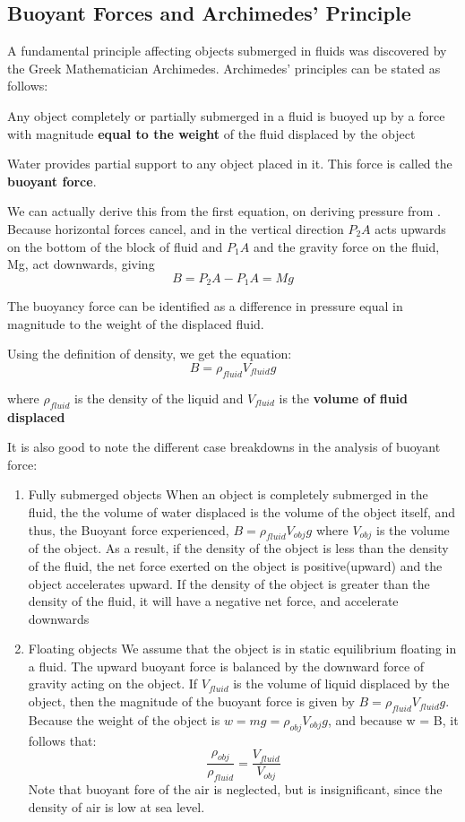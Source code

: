 \subsection{Buoyant Forces and Archimedes' Principle}
A fundamental principle affecting objects submerged in fluids was discovered by the Greek Mathematician Archimedes. Archimedes' principles can be stated as follows:

\begin{defi}
Any object completely or partially submerged in a fluid is buoyed up by a force with magnitude \textbf{equal to the weight} of the fluid displaced by the object
\end{defi}

Water provides partial support to any object placed in it. This force is called the \textbf{buoyant force}.

We can actually derive this from the first equation, on deriving pressure from . Because horizontal forces cancel, and in the vertical direction $P_2A$ acts upwards on the bottom of the block of fluid and $P_1A$ and the gravity force on the fluid, Mg, act downwards, giving
$$B=P_2A-P_1A = Mg$$

The buoyancy force can be identified as a difference in pressure equal in magnitude to the weight of the displaced fluid.

Using the definition of density, we get the equation:
$$B=\rho_{fluid}V_{fluid}g$$

where $\rho_{fluid}$ is the density of the liquid
and $V_{fluid}$ is the \textbf{volume of fluid displaced}

It is also good to note the different case breakdowns in the analysis of buoyant force:
\begin{enumerate}
\item Fully submerged objects
\subitem When an object is completely submerged in the fluid, the the volume of water displaced is the volume of the object itself, and thus, the Buoyant force experienced, $B=\rho_{fluid}V_{obj}g$ where $V_{obj}$ is the volume of the object.
\subitem As a result, if the density of the object is less than the density of the fluid, the net force exerted on the object is positive(upward) and the object accelerates upward.
\subitem If the density of the object is greater than the density of the fluid, it will have a negative net force, and accelerate downwards
\item Floating objects
\subitem We assume that the object is in static equilibrium floating in a fluid.
\subitem The upward buoyant force is balanced by the downward force of gravity acting on the object. If $V_{fluid}$ is the volume of liquid displaced by the object, then the magnitude of the buoyant force is given by $B=\rho_{fluid}V_{fluid}g$. Because the weight of the object is $w=mg=\rho_{obj}V_{obj}g$, and because w = B, it follows that:
$$\frac{\rho_{obj}}{\rho_{fluid}}=\frac{V_{fluid}}{V_{obj}}$$
\subitem Note that buoyant fore of the air is neglected, but is insignificant, since the density of air is low at sea level.
\end{enumerate}

